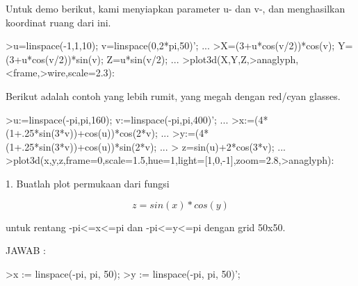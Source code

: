 \documentclass{article}
\begin{document}
\begin{eulernotebook}
\begin{eulercomment}
\begin{eulercomment}
\begin{eulercomment}
\begin{eulercomment}
\begin{eulercomment}
\begin{eulercomment}
\begin{eulercomment}
\begin{eulercomment}
\begin{eulercomment}
\begin{eulercomment}
\begin{eulercomment}
Untuk demo berikut, kami menyiapkan parameter u- dan v-, dan
menghasilkan koordinat ruang dari ini.
\end{eulercomment}
\begin{eulerprompt}
>u=linspace(-1,1,10); v=linspace(0,2*pi,50)'; ...
>X=(3+u*cos(v/2))*cos(v); Y=(3+u*cos(v/2))*sin(v); Z=u*sin(v/2); ...
>plot3d(X,Y,Z,>anaglyph,<frame,>wire,scale=2.3):
\end{eulerprompt}
\begin{eulercomment}
Berikut adalah contoh yang lebih rumit, yang megah dengan red/cyan
glasses.
\end{eulercomment}
\begin{eulerprompt}
>u:=linspace(-pi,pi,160); v:=linspace(-pi,pi,400)';  ...
>x:=(4*(1+.25*sin(3*v))+cos(u))*cos(2*v); ...
>y:=(4*(1+.25*sin(3*v))+cos(u))*sin(2*v); ...
> z=sin(u)+2*cos(3*v); ...
>plot3d(x,y,z,frame=0,scale=1.5,hue=1,light=[1,0,-1],zoom=2.8,>anaglyph):
\end{eulerprompt}
\eulersubheading{}
\begin{eulercomment}
\end{eulercomment}
\begin{eulercomment}
1. Buatlah plot permukaan dari fungsi\\
\end{eulercomment}
\begin{eulerformula}
\[
z=sin(x)*cos(y)
\]
\end{eulerformula}
\begin{eulercomment}
untuk rentang -pi\textless{}=x\textless{}=pi dan -pi\textless{}=y\textless{}=pi dengan grid 50x50.

JAWAB :
\end{eulercomment}
\begin{eulerprompt}
>x := linspace(-pi, pi, 50);
>y := linspace(-pi, pi, 50)';
\end{eulerprompt}
\begin{euleroutput}
  

\end{euleroutput}
\end{eulercomment}
\end{eulercomment}
\end{eulercomment}
\end{eulercomment}
\end{eulercomment}
\end{eulercomment}
\end{eulercomment}
\end{eulercomment}
\end{eulercomment}
\end{eulercomment}
\end{eulernotebook}
\end{document}
